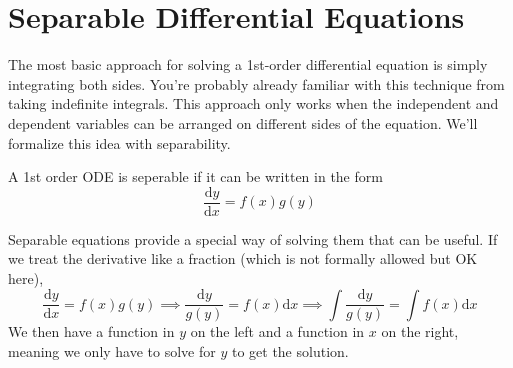 \section{Separable Differential Equations}
\noindent
The most basic approach for solving a 1st-order differential equation is simply integrating both sides. You're probably already familiar with this technique from taking indefinite integrals. This approach only works when the independent and dependent variables can be arranged on different sides of the equation. We'll formalize this idea with separability.

\begin{definition}
	A 1st order ODE is seperable if it can be written in the form
	\begin{equation*}
		\frac{\mathrm{d} y}{\mathrm{d} x} = f(x)g(y)
	\end{equation*}
\end{definition}

\noindent
Separable equations provide a special way of solving them that can be useful. If we treat the derivative like a fraction (which is not formally allowed but OK here),
\begin{equation*}
	\frac{\mathrm{d} y}{\mathrm{d} x} = f(x)g(y) \implies \frac{\mathrm{d} y}{g(y)} = f(x) \mathrm{d}x \implies \int{\frac{\mathrm{d} y}{g(y)}} = \int{f(x) \mathrm{d}x}
\end{equation*}
We then have a function in $y$ on the left and a function in $x$ on the right, meaning we only have to solve for $y$ to get the solution.

\ifodd{}\fi